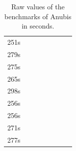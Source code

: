 \documentclass{scrartcl}
\begin{document}
\begin{table}[h]
\begin{tabular}{@{}llllllll@{}}
\multicolumn{1}{r}{251s} &  & \\
\multicolumn{1}{r}{279s} &  & \\
\multicolumn{1}{r}{275s} &  & \\
\multicolumn{1}{r}{265s} &  & \\
\multicolumn{1}{r}{298s} &  & \\
\multicolumn{1}{r}{256s} &  & \\
\multicolumn{1}{r}{256s} &  & \\
\multicolumn{1}{r}{271s} &  & \\
\multicolumn{1}{r}{277s} &  & \\ \bottomrule
\end{tabular}
\caption{Raw values of the benchmarks of Anubis in seconds.}
\label{rawdata_an}
\end{table}
\end{document}
